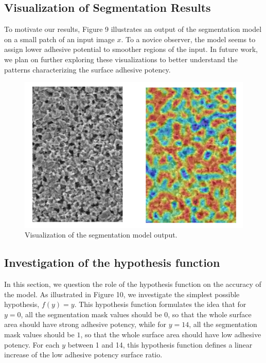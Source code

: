 \documentclass[10pt,twocolumn,letterpaper]{article}
\begin{document}
\subsection{Visualization of Segmentation Results}

To motivate our results, Figure 9 illustrates an output of the segmentation model on a small patch of an input image $x$.
To a novice observer, the model seems to assign lower adhesive potential to smoother regions of the input.
In future work, we plan on further exploring these visualizations to better understand the 
patterns characterizing the surface adhesive potency.

\begin{figure}[h]
	\centering
	\includegraphics[width=0.9\linewidth]{"./figures/Figure9"}
	\caption{
		Visualization of the segmentation model output.
	}
\end{figure}

\subsection{Investigation of the hypothesis function}

In this section, we question the role of the hypothesis function on the accuracy of the model.
As illustrated in Figure 10, we investigate the simplest possible hypothesis, $f(y)=y$.
This hypothesis function formulates the idea that for $y=0$, 
all the  segmentation mask values should be 0, 
so that the whole surface area should have strong adhesive potency, 
while for $y=14$, all the segmentation mask values should be $1$, so that 
the whole surface area should have low adhesive potency.
For each $y$ between 1 and 14, this hypothesis function defines a linear increase
of the low adhesive potency surface ratio.
\end{document}
